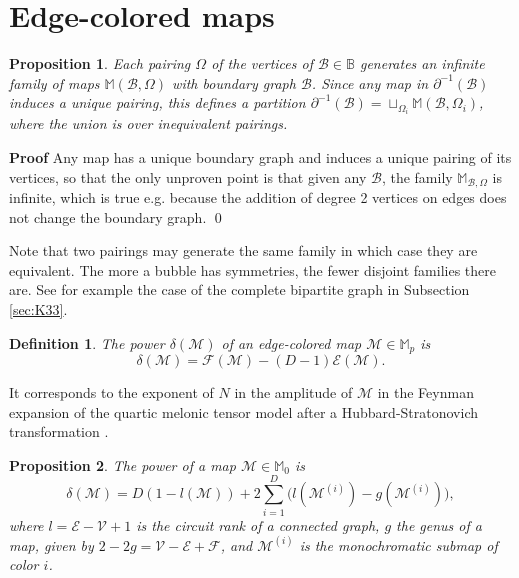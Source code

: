 \documentclass[aps,prd,10pt,notitlepage,nofootinbib,superscriptaddress,showkeys,showpacs]{revtex4-1}
\newtheorem{definition}{Definition}
\newtheorem{prop}{Proposition}
\begin{document}
\appendix

\section{Edge-colored maps} \label{sec:EdgeColoredMaps}

\begin{prop}
Each pairing $\Omega$ of the vertices of ${\mathcal{B}}\in{\mathbb{B}}$ generates an infinite family of maps ${\mathbb{M}}({\mathcal{B}},\Omega)$ with boundary graph ${\mathcal{B}}$. Since any map in $\partial^{-1}({\mathcal{B}})$ induces a unique pairing, this defines a partition $\partial^{-1}({\mathcal{B}})=\sqcup_{\Omega_{i}}{\mathbb{M}}({\mathcal{B}}, \Omega_{i})$, where the union is over inequivalent pairings.
\end{prop}

{{\noindent \bf Proof\; \; }} Any map has a unique boundary graph and induces a unique pairing of its vertices, so that the only unproven point is that given any ${\mathcal{B}}$, the family ${\mathbb{M}}_{{\mathcal{B}}, \Omega}$ is infinite, which is true e.g. because the addition of degree 2 vertices on edges does not change the boundary graph.
\qed
 
Note that two pairings may generate the same family in which case they are equivalent. The more a bubble has symmetries, the fewer disjoint families there are. See for example the case of the complete bipartite graph in Subsection \ref{sec:K33}.
 
\begin{definition}
The \emph{power} $\delta({\mathcal{M}})$ of an edge-colored map ${\mathcal{M}}\in{\mathbb{M}}_p$ is 
\begin{equation}
\delta({\mathcal{M}}) = {\mathcal{F}}({\mathcal{M}}) - (D-1){\mathcal{E}}({\mathcal{M}}).
\end{equation}
\end{definition} 
It corresponds to the exponent of $N$ in the amplitude of ${\mathcal{M}}$ in the Feynman expansion of the quartic melonic tensor model after a Hubbard-Stratonovich transformation \cite{DSDartois, BeyondPert}.

\begin{prop}
\label{prop:PowVacQuart}
The power of a map ${\mathcal{M}}\in{\mathbb{M}}_0$ is
\begin{equation}
\label{eqref:PowerVacQuart}
\delta({\mathcal{M}}) = D(1-l({\mathcal{M}}))+2\sum_{i=1}^D \bigl(l({\mathcal{M}}^{(i)})-g({\mathcal{M}}^{(i)})\bigr),
\end{equation}
where $l={\mathcal{E}}-{\mathcal{V}}+1$ is the circuit rank of a connected graph, $g$ the genus of a map, given by $2-2g={\mathcal{V}}-{\mathcal{E}}+{\mathcal{F}}$, and ${\mathcal{M}}^{(i)}$ is the monochromatic submap of color $i$.
\end{prop}
 
\end{document}
